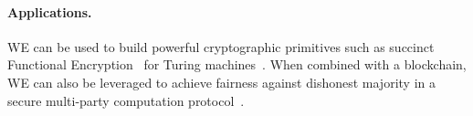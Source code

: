 \paragraph{Applications.}
WE can be used to build powerful cryptographic primitives such as succinct Functional Encryption~\cite{functional_encryption} for Turing machines~\cite{turing_machine_fe}.
When combined with a blockchain, WE can also be leveraged to achieve fairness against dishonest majority in a secure multi-party computation protocol~\cite{we_mpc_fairness}.